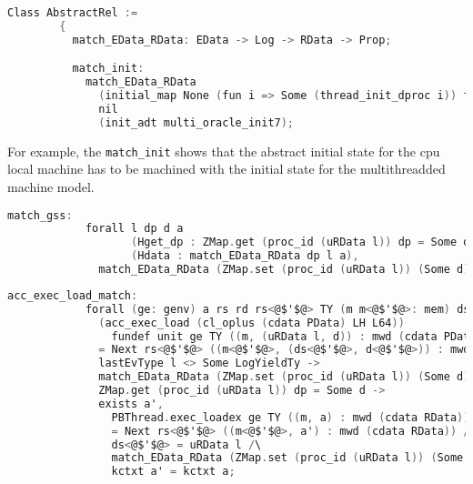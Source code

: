 \begin{lstlisting}[language=C]
      Class AbstractRel :=
        {
          match_EData_RData: EData -> Log -> RData -> Prop;

          match_init:
            match_EData_RData
              (initial_map None (fun i => Some (thread_init_dproc i)) full_thread_list)
              nil
              (init_adt multi_oracle_init7);
\end{lstlisting}
For example, the \lstinline$match_init$ 
shows that the abstract initial state for the cpu local machine 
has to be machined with the initial state for the multithreadded machine model.          
         
\begin{lstlisting}[language=C]          
          match_gss:
            forall l dp d a
                   (Hget_dp : ZMap.get (proc_id (uRData l)) dp = Some d)
                   (Hdata : match_EData_RData dp l a),
              match_EData_RData (ZMap.set (proc_id (uRData l)) (Some d) dp) l a;
\end{lstlisting}
         
         
\begin{lstlisting}[language=C]          
          acc_exec_load_match:
            forall (ge: genv) a rs rd rs<@$'$@> TY (m m<@$'$@>: mem) ds<@$'$@> l dp d<@$'$@> d addr,
              (acc_exec_load (cl_oplus (cdata PData) LH L64)) 
                fundef unit ge TY ((m, (uRData l, d)) : mwd (cdata PData)) addr rs rd 
              = Next rs<@$'$@> ((m<@$'$@>, (ds<@$'$@>, d<@$'$@>)) : mwd (cdata PData)) ->
              lastEvType l <> Some LogYieldTy ->
              match_EData_RData (ZMap.set (proc_id (uRData l)) (Some d) dp) l a ->
              ZMap.get (proc_id (uRData l)) dp = Some d ->
              exists a',
                PBThread.exec_loadex ge TY ((m, a) : mwd (cdata RData)) addr rs rd 
                = Next rs<@$'$@> ((m<@$'$@>, a') : mwd (cdata RData)) /\
                ds<@$'$@> = uRData l /\
                match_EData_RData (ZMap.set (proc_id (uRData l)) (Some d<@$'$@>) dp) l a' /\
                kctxt a' = kctxt a;
\end{lstlisting}


